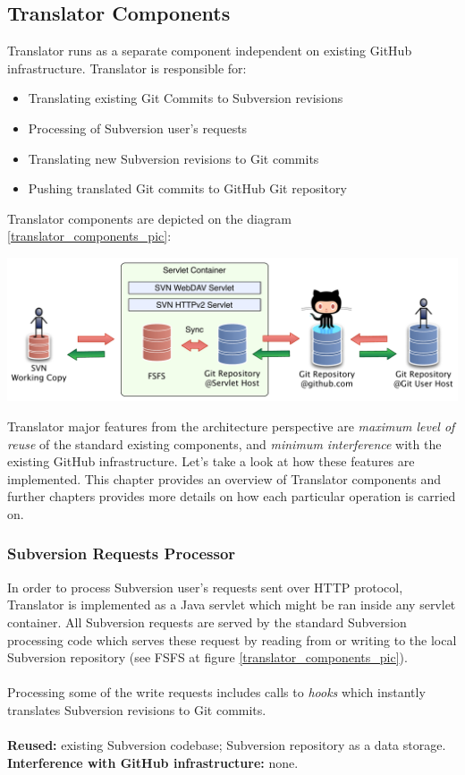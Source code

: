 \subsection{Translator Components}
\renewcommand{\figurename}{Figure}

Translator runs as a separate component independent on existing GitHub infrastructure. Translator is responsible for:
\begin{itemize}
  \item Translating existing Git Commits to Subversion revisions
  \item Processing of Subversion user's requests
  \item Translating new Subversion revisions to Git commits
  \item Pushing translated Git commits to GitHub Git repository
\end{itemize}
Translator components are depicted on the diagram \ref{translator_components_pic}:
\begin{center}
\includegraphics[width=\textwidth]{img/servlet/components_keep_github_safe.pdf}%
\label{translator_components_pic}%
\end{center}

Translator major features from the architecture perspective are \emph{maximum level of reuse} of the standard existing components, and \emph{minimum interference} with the existing GitHub infrastructure. 
Let's take a look at how these features are implemented. This chapter provides an overview of Translator components and further chapters provides more details on how each particular operation is carried on.

\label{srp}
\subsubsection{Subversion Requests Processor}
In order to process Subversion user's requests sent over HTTP protocol, Translator is implemented as a Java servlet which might be ran inside any servlet container. All Subversion requests are served by the standard Subversion processing code which serves 
these request by reading from or writing to the local Subversion repository (see FSFS at figure \ref{translator_components_pic}).
\\\\
Processing some of the write requests includes calls to \emph{hooks} which instantly translates Subversion revisions to Git commits.
\\\\
\textbf{Reused:} existing Subversion codebase; Subversion repository as a data storage.\\
\textbf{Interference with GitHub infrastructure:} none. 

